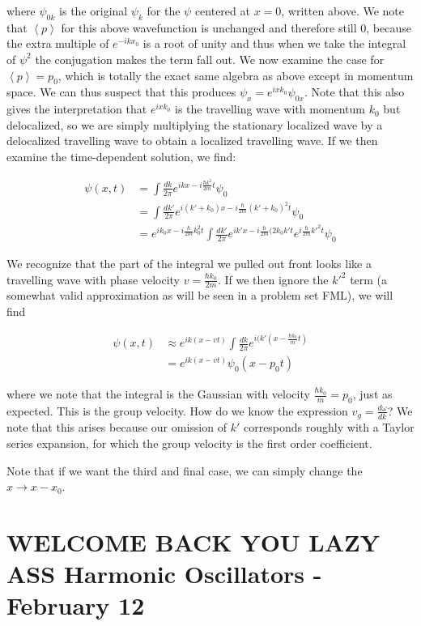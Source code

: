 \documentclass{report}
\begin{document}
where $\psi_{0k}$ is the original $\psi_{k}$ for the $\psi$ centered at $x = 0$, written above. We note that $\left<p\right>$ for this above wavefunction is unchanged and therefore still $0$, because the extra multiple of $e^{-ikx_0}$ is a root of unity and thus when we take the integral of $\psi^2$ the conjugation makes the term fall out. We now examine the case for $\left<p\right> = p_0$, which is totally the exact same algebra as above except in momentum space. We can thus suspect that this produces $\psi_x = e^{ixk_0} \psi_{0x}$. Note that this also gives the interpretation that $e^{ixk_0}$ is the travelling wave with momentum $k_0$ but delocalized, so we are simply multiplying the stationary localized wave by a delocalized travelling wave to obtain a localized travelling wave. If we then examine the time-dependent solution, we find:

\begin{align*}
    \psi(x,t) &= \int \frac{dk}{2\pi} e^{ikx - i\frac{\hbar k^2}{2m}t}\psi_0\\
              &= \int \frac{dk'}{2\pi} e^{i(k' + k_0)x - i\frac{\hbar}{2m}(k' + k_0)^2t}\psi_0\\
              &= e^{ik_0x - i\frac{\hbar}{2m}k_0^2t}\int \frac{dk'}{2\pi}e^{ik'x - i\frac{\hbar}{2m}(2k_0k't}e^{i\frac{\hbar}{2m}k'^2t}\psi_0
\end{align*}

We recognize that the part of the integral we pulled out front looks like a travelling wave with phase velocity $v = \frac{\hbar k_0}{2m}$. If we then ignore the $k'^2$ term (a somewhat valid approximation as will be seen in a problem set FML), we will find

\begin{align*}
    \psi(x,t) &\approx e^{ik(x-vt)}\int\frac{dk}{2\pi} e^{i(k'(x - \frac{\hbar k_0}{m}t)}\\
              &= e^{ik(x-vt)}\psi_0(x-p_0t)
\end{align*}

where we note that the integral is the Gaussian with velocity $\frac{\hbar k_0}{m} = p_0$, just as expected. This is the group velocity. How do we know the expression $v_g = \frac{d\omega}{dk}$? We note that this arises because our omission of $k'$ corresponds roughly with a Taylor series expansion, for which the group velocity is the first order coefficient. 

Note that if we want the third and final case, we can simply change the $x \to x - x_0$.

\chapter{WELCOME BACK YOU LAZY ASS Harmonic Oscillators - February 12}
\end{document}
